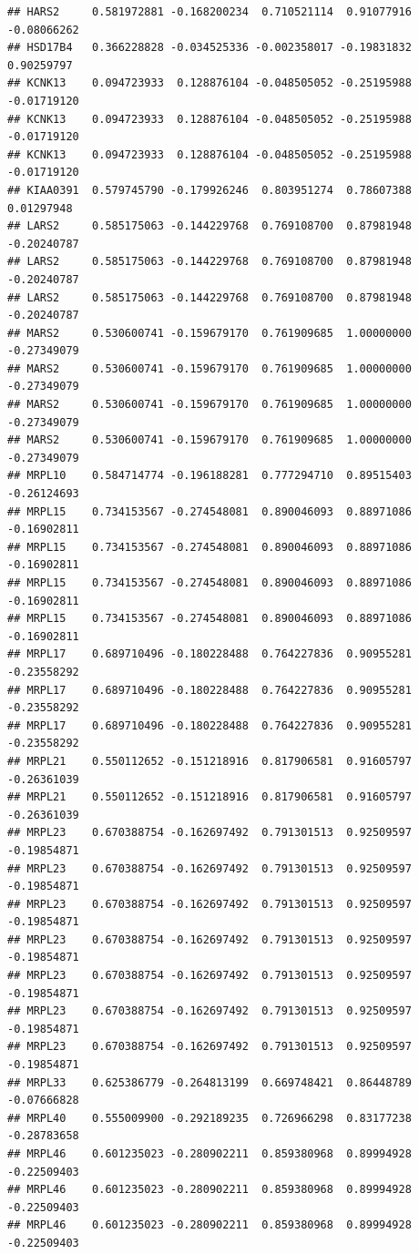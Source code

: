 \documentclass[
]{article}
\begin{document}
\begin{verbatim}
## HARS2     0.581972881 -0.168200234  0.710521114  0.91077916 -0.08066262
## HSD17B4   0.366228828 -0.034525336 -0.002358017 -0.19831832  0.90259797
## KCNK13    0.094723933  0.128876104 -0.048505052 -0.25195988 -0.01719120
## KCNK13    0.094723933  0.128876104 -0.048505052 -0.25195988 -0.01719120
## KCNK13    0.094723933  0.128876104 -0.048505052 -0.25195988 -0.01719120
## KIAA0391  0.579745790 -0.179926246  0.803951274  0.78607388  0.01297948
## LARS2     0.585175063 -0.144229768  0.769108700  0.87981948 -0.20240787
## LARS2     0.585175063 -0.144229768  0.769108700  0.87981948 -0.20240787
## LARS2     0.585175063 -0.144229768  0.769108700  0.87981948 -0.20240787
## MARS2     0.530600741 -0.159679170  0.761909685  1.00000000 -0.27349079
## MARS2     0.530600741 -0.159679170  0.761909685  1.00000000 -0.27349079
## MARS2     0.530600741 -0.159679170  0.761909685  1.00000000 -0.27349079
## MARS2     0.530600741 -0.159679170  0.761909685  1.00000000 -0.27349079
## MRPL10    0.584714774 -0.196188281  0.777294710  0.89515403 -0.26124693
## MRPL15    0.734153567 -0.274548081  0.890046093  0.88971086 -0.16902811
## MRPL15    0.734153567 -0.274548081  0.890046093  0.88971086 -0.16902811
## MRPL15    0.734153567 -0.274548081  0.890046093  0.88971086 -0.16902811
## MRPL15    0.734153567 -0.274548081  0.890046093  0.88971086 -0.16902811
## MRPL17    0.689710496 -0.180228488  0.764227836  0.90955281 -0.23558292
## MRPL17    0.689710496 -0.180228488  0.764227836  0.90955281 -0.23558292
## MRPL17    0.689710496 -0.180228488  0.764227836  0.90955281 -0.23558292
## MRPL21    0.550112652 -0.151218916  0.817906581  0.91605797 -0.26361039
## MRPL21    0.550112652 -0.151218916  0.817906581  0.91605797 -0.26361039
## MRPL23    0.670388754 -0.162697492  0.791301513  0.92509597 -0.19854871
## MRPL23    0.670388754 -0.162697492  0.791301513  0.92509597 -0.19854871
## MRPL23    0.670388754 -0.162697492  0.791301513  0.92509597 -0.19854871
## MRPL23    0.670388754 -0.162697492  0.791301513  0.92509597 -0.19854871
## MRPL23    0.670388754 -0.162697492  0.791301513  0.92509597 -0.19854871
## MRPL23    0.670388754 -0.162697492  0.791301513  0.92509597 -0.19854871
## MRPL23    0.670388754 -0.162697492  0.791301513  0.92509597 -0.19854871
## MRPL33    0.625386779 -0.264813199  0.669748421  0.86448789 -0.07666828
## MRPL40    0.555009900 -0.292189235  0.726966298  0.83177238 -0.28783658
## MRPL46    0.601235023 -0.280902211  0.859380968  0.89994928 -0.22509403
## MRPL46    0.601235023 -0.280902211  0.859380968  0.89994928 -0.22509403
## MRPL46    0.601235023 -0.280902211  0.859380968  0.89994928 -0.22509403

\end{verbatim}
\end{document}
